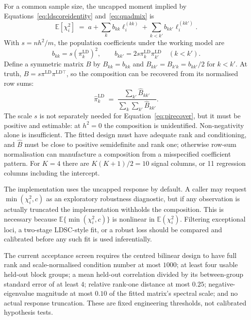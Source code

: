 \documentclass[11pt,a4paper]{article}
\begin{document}
For a common sample size, the uncapped moment implied by
Equations~\eqref{eq:ldscoreidentity} and~\eqref{eq:quadmix} is
\begin{equation}\label{eq:bireg}
  \mathbb{E}\!\left[ \chi^2_i \right]
  \;=\;
  a + \sum_k b_{kk}\ell^{(kk)}_i
    + \sum_{k<k'}b_{kk'}\ell^{(kk')}_i.
\end{equation}
With $s=nh^2/m$, the population coefficients under the working model are
\begin{equation}\label{eq:bcoef}
  b_{kk}=s(\pi^{\mathrm{LD}}_k)^2,
  \qquad
  b_{kk'}=2s\pi^{\mathrm{LD}}_k\pi^{\mathrm{LD}}_{k'}
  \quad (k<k').
\end{equation}
Define a symmetric matrix $B$ by $B_{kk}=b_{kk}$ and
$B_{kk'}=B_{k'k}=b_{kk'}/2$ for $k<k'$. At truth,
$B=s\pi^{\mathrm{LD}}\pi^{\mathrm{LD}\top}$, so the composition can be
recovered from its normalised row sums:
\begin{equation}\label{eq:pirecover}
  \hat\pi^{\mathrm{LD}}_k
  \;=\;
  \frac{\sum_{k'} \hat B_{kk'}}
       {\sum_{k}\sum_{k'} \hat B_{kk'}} .
\end{equation}
The scale $s$ is not separately needed for Equation~\eqref{eq:pirecover},
but it must be positive and estimable: at $h^2=0$ the composition is
unidentified. Non-negativity alone is insufficient. The fitted design must
have adequate rank and conditioning, and $\hat B$ must be close to positive
semidefinite and rank one; otherwise row-sum normalisation can manufacture a
composition from a misspecified coefficient pattern. For $K=4$ there are
$K(K+1)/2=10$ signal columns, or 11 regression columns including the
intercept.

The implementation uses the uncapped response by default. A caller may
request $\min(\chi_i^2,c)$ as an exploratory robustness diagnostic, but if
any observation is actually truncated the implementation withholds the
composition. This is necessary because
$\mathbb{E}\{\min(\chi_i^2,c)\}$ is nonlinear in
$\mathbb{E}(\chi_i^2)$. Filtering exceptional loci, a two-stage LDSC-style
fit, or a robust loss should be compared and calibrated before any such fit
is used inferentially.

The current acceptance screen requires the centred bilinear design to have
full rank and scale-normalised condition number at most $1000$; at least four
usable held-out block groups; a mean held-out correlation divided by its
between-group standard error of at least $4$; relative rank-one distance at
most $0.25$; negative-eigenvalue magnitude at most $0.10$ of the fitted
matrix's spectral scale; and no actual response truncation. These are fixed
engineering thresholds, not calibrated hypothesis tests.
\end{document}
